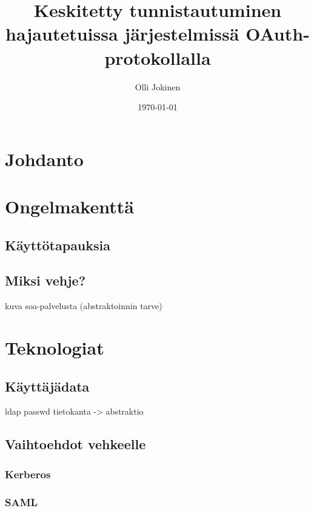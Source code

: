 \documentclass{tktltiki}
\begin{document}
\title{Keskitetty tunnistautuminen hajautetuissa järjestelmissä OAuth-protokollalla}
\author{Olli Jokinen}
\date{\today}
\maketitle
\doublespacing
{}
\subject{Tietojenkäsittelytiede}
\additionalinformation{}
\begin{abstract}

\end{abstract}
\mytableofcontents
\section{Johdanto}

\section{Ongelmakenttä}
\subsection{Käyttötapauksia}
\subsection{Miksi vehje?}
kuva soa-palvelusta (abstraktoinnin tarve)
\section{Teknologiat}
\subsection{Käyttäjädata}
ldap
passwd
tietokanta
-> abstraktio
\subsection{Vaihtoehdot vehkeelle}
\subsubsection{Kerberos}

\subsubsection{SAML}

\end{document}

